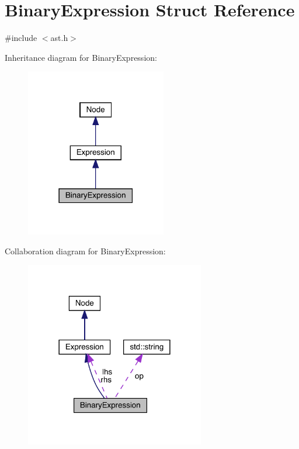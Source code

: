 \hypertarget{struct_binary_expression}{}\section{Binary\+Expression Struct Reference}
\label{struct_binary_expression}


{\ttfamily \#include $<$ast.\+h$>$}



Inheritance diagram for Binary\+Expression\+:\nopagebreak
\begin{figure}[H]
\begin{center}
\leavevmode
\includegraphics[width=174pt]{struct_binary_expression__inherit__graph}
\end{center}
\end{figure}


Collaboration diagram for Binary\+Expression\+:\nopagebreak
\begin{figure}[H]
\begin{center}
\leavevmode
\includegraphics[width=222pt]{struct_binary_expression__coll__graph}
\end{center}
\end{figure}
